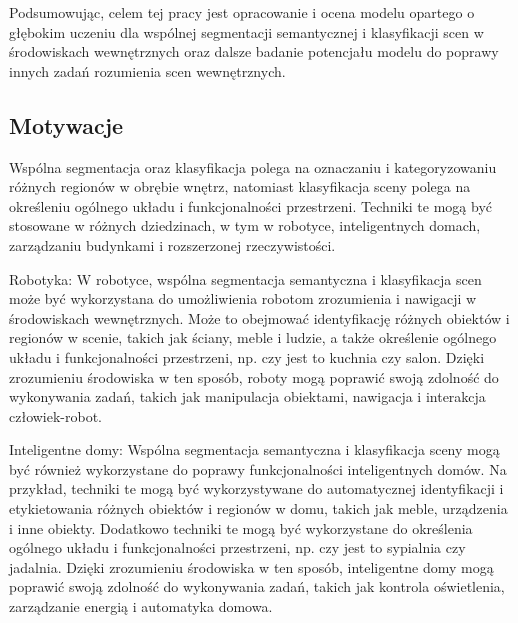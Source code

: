 Podsumowując, celem tej pracy jest opracowanie i ocena modelu opartego o głębokim uczeniu dla wspólnej segmentacji semantycznej i klasyfikacji scen w środowiskach wewnętrznych oraz dalsze badanie potencjału modelu do poprawy innych zadań rozumienia scen wewnętrznych.

\subsection{Motywacje}


Wspólna segmentacja oraz klasyfikacja polega na oznaczaniu i kategoryzowaniu różnych regionów w obrębie wnętrz, natomiast klasyfikacja sceny polega na określeniu ogólnego układu i funkcjonalności przestrzeni. Techniki te mogą być stosowane w różnych dziedzinach, w tym w robotyce, inteligentnych domach, zarządzaniu budynkami i rozszerzonej rzeczywistości.

Robotyka:
W robotyce, wspólna segmentacja semantyczna i klasyfikacja scen może być wykorzystana do umożliwienia robotom zrozumienia i nawigacji w środowiskach wewnętrznych. Może to obejmować identyfikację różnych obiektów i regionów w scenie, takich jak ściany, meble i ludzie, a także określenie ogólnego układu i funkcjonalności przestrzeni, np. czy jest to kuchnia czy salon. Dzięki zrozumieniu środowiska w ten sposób, roboty mogą poprawić swoją zdolność do wykonywania zadań, takich jak manipulacja obiektami, nawigacja i interakcja człowiek-robot.

Inteligentne domy:
Wspólna segmentacja semantyczna i klasyfikacja sceny mogą być również wykorzystane do poprawy funkcjonalności inteligentnych domów. Na przykład, techniki te mogą być wykorzystywane do automatycznej identyfikacji i etykietowania różnych obiektów i regionów w domu, takich jak meble, urządzenia i inne obiekty. Dodatkowo techniki te mogą być wykorzystane do określenia ogólnego układu i funkcjonalności przestrzeni, np. czy jest to sypialnia czy jadalnia. Dzięki zrozumieniu środowiska w ten sposób, inteligentne domy mogą poprawić swoją zdolność do wykonywania zadań, takich jak kontrola oświetlenia, zarządzanie energią i automatyka domowa.


